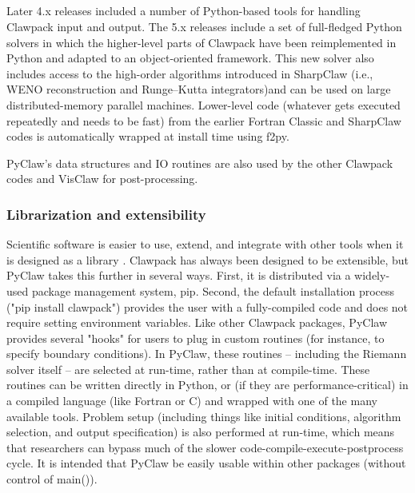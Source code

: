 %
%
%

\subsection{\pyclaw} \label{sec:pyclaw}

Later 4.x releases included a number of Python-based tools for handling
Clawpack input and output.  The 5.x releases include a set of full-fledged Python
solvers in which the higher-level parts of Clawpack have been reimplemented in
Python and adapted to an object-oriented framework.  This new solver also
includes access to the high-order algorithms introduced in SharpClaw (i.e.,
WENO reconstruction and Runge--Kutta integrators)and can be used on large
distributed-memory parallel machines.  Lower-level code (whatever gets executed
repeatedly and needs to be fast) from the earlier Fortran Classic and SharpClaw
codes is automatically wrapped at install time using f2py.

PyClaw's data structures and IO routines are also used by the other Clawpack
codes and VisClaw for post-processing.

\subsubsection{Librarization and extensibility}
Scientific software is easier to use, extend, and integrate with other tools when
it is designed as a library \cite{brown2014run}.  Clawpack has always been designed
to be extensible, but PyClaw takes this further in several ways.  First, it is
distributed via a widely-used package management system, pip.
Second, the default installation process ("pip install clawpack")
provides the user with a fully-compiled code and does not require setting environment
variables.  Like other Clawpack packages, PyClaw provides several "hooks" for users
to plug in custom routines (for instance, to specify boundary conditions).
In PyClaw, these routines -- including the Riemann solver itself -- are selected at
run-time, rather than at compile-time.  These routines can be written directly in
Python, or (if they are performance-critical) in a compiled language (like Fortran or C)
and wrapped with one of the many available tools.  Problem setup (including things like
initial conditions, algorithm selection, and output specification) is also
performed at run-time, which means that researchers can bypass much of the slower
code-compile-execute-postprocess cycle.
It is intended that PyClaw be easily usable within other packages (without control of main()).

